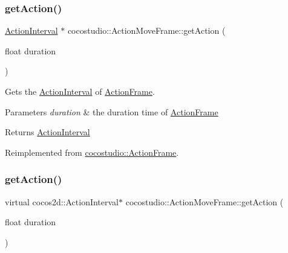 \subsubsection{\texorpdfstring{get\+Action()}{getAction()}\hspace{0.1cm}{\footnotesize\ttfamily [1/2]}}
{\footnotesize\ttfamily \hyperlink{classActionInterval}{Action\+Interval} $\ast$ cocostudio\+::\+Action\+Move\+Frame\+::get\+Action (\begin{DoxyParamCaption}\item[{float}]{duration }\end{DoxyParamCaption})\hspace{0.3cm}{\ttfamily [virtual]}}

Gets the \hyperlink{classActionInterval}{Action\+Interval} of \hyperlink{classcocostudio_1_1ActionFrame}{Action\+Frame}.


\begin{DoxyParams}{Parameters}
{\em duration} & the duration time of \hyperlink{classcocostudio_1_1ActionFrame}{Action\+Frame}\\
\hline
\end{DoxyParams}
\begin{DoxyReturn}{Returns}
\hyperlink{classActionInterval}{Action\+Interval} 
\end{DoxyReturn}


Reimplemented from \hyperlink{classcocostudio_1_1ActionFrame_a375216a44f6643d5e771299b1236dc51}{cocostudio\+::\+Action\+Frame}.

\mbox{\label{classcocostudio_1_1ActionMoveFrame_acdacf22506bf13d5214f70d25b7cfed8}} 
\subsubsection{\texorpdfstring{get\+Action()}{getAction()}\hspace{0.1cm}{\footnotesize\ttfamily [2/2]}}
{\footnotesize\ttfamily virtual cocos2d\+::\+Action\+Interval$\ast$ cocostudio\+::\+Action\+Move\+Frame\+::get\+Action (\begin{DoxyParamCaption}\item[{float}]{duration }\end{DoxyParamCaption})\hspace{0.3cm}{\ttfamily [virtual]}}

